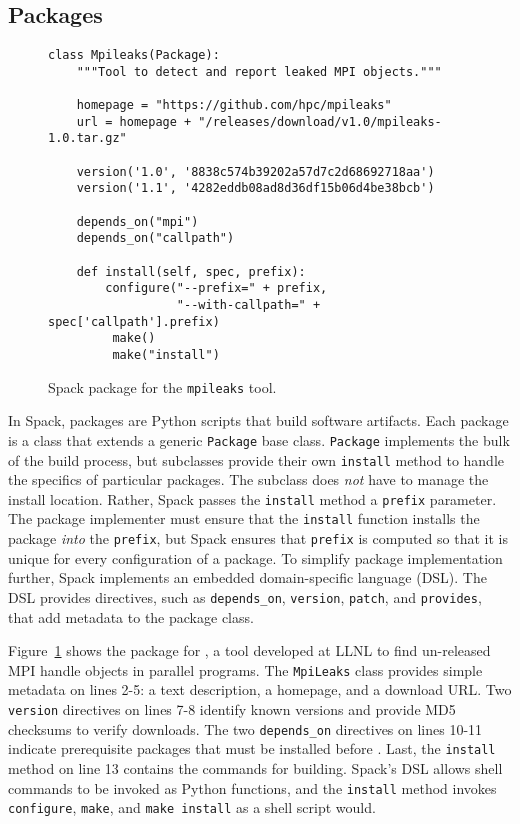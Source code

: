 
\subsection{Packages}\label{sec:packages}

\begin{figure}
\begin{verbatim}
class Mpileaks(Package):
    """Tool to detect and report leaked MPI objects."""

    homepage = "https://github.com/hpc/mpileaks"
    url = homepage + "/releases/download/v1.0/mpileaks-1.0.tar.gz"

    version('1.0', '8838c574b39202a57d7c2d68692718aa')
    version('1.1', '4282eddb08ad8d36df15b06d4be38bcb')

    depends_on("mpi")
    depends_on("callpath")

    def install(self, spec, prefix):
        configure("--prefix=" + prefix,
                  "--with-callpath=" + spec['callpath'].prefix)
         make()
         make("install")
\end{verbatim}
	\caption{
		Spack package for the {\tt mpileaks} tool.
		\label{fig:mpileaks}
	}
\end{figure}

In Spack, packages are Python scripts that build software artifacts.
Each package is a class that extends a generic {\tt Package}
base class.  {\tt Package} implements the bulk of the build process, but
subclasses provide their own {\tt install} method to handle the
specifics of particular packages. The subclass does {\it not} have to
manage the install location.  Rather, Spack passes the {\tt install}
method a {\tt prefix} parameter.  The package implementer must ensure that
the {\tt install} function installs the package {\it into} the {\tt prefix},
but Spack ensures that {\tt prefix} is computed so that it is
unique for every configuration of a package.  To simplify package 
implementation further, Spack implements an embedded domain-specific
language (DSL).
The DSL provides directives, such as {\tt depends\_on},
{\tt version}, {\tt patch}, and {\tt provides}, that add metadata
to the package class.

Figure~\ref{fig:mpileaks} shows the package for \mpileaks, a tool developed
at LLNL to find un-released MPI handle objects in parallel programs.
The {\tt MpiLeaks} class provides simple metadata on lines 2-5: a text
description, a homepage, and a download URL.
Two {\tt version} directives on lines 7-8 identify known versions and provide
MD5 checksums to verify downloads.
The two {\tt depends\_on} directives on lines 10-11 indicate prerequisite
packages that must be installed before \mpileaks.
Last, the {\tt install} method on line 13 contains the commands for building.
Spack's DSL allows shell commands to be invoked as Python functions,
and the {\tt install} method invokes {\tt configure},
{\tt make}, and {\tt make install} as a shell script would.
